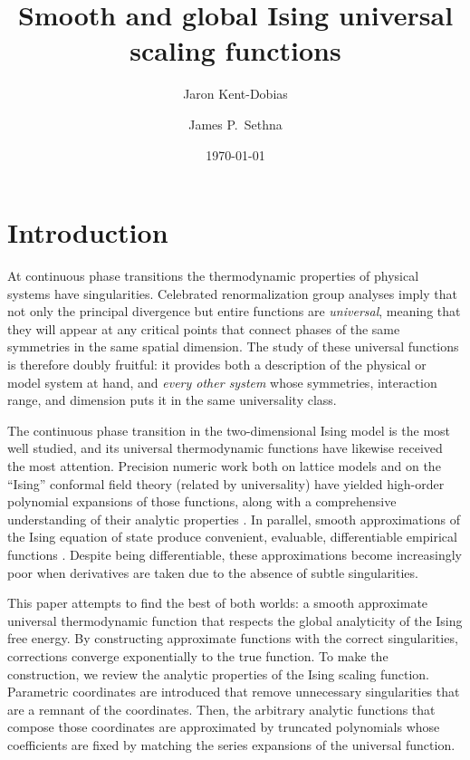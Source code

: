 \documentclass[
  aps,
  pre,
  preprint,
  longbibliography,
  floatfix
]{revtex4-2}
\begin{document}
\title{Smooth and global Ising universal scaling functions}

\author{Jaron Kent-Dobias}

\author{James P.~Sethna}

\date\today

\begin{abstract}
\end{abstract}

\maketitle

\section{Introduction}

At continuous phase transitions the thermodynamic properties of physical
systems have singularities. Celebrated renormalization group analyses imply
that not only the principal divergence but entire functions are
\emph{universal}, meaning that they will appear at any critical points that
connect phases of the same symmetries in the same spatial dimension. The study
of these universal functions is therefore doubly fruitful: it provides both a
description of the physical or model system at hand, and \emph{every other
system} whose symmetries, interaction range, and dimension puts it in the same
universality class.

The continuous phase transition in the two-dimensional Ising model is the most
well studied, and its universal thermodynamic functions have likewise received
the most attention. Precision numeric work both on lattice models and on the
``Ising'' conformal field theory (related by universality) have yielded
high-order polynomial expansions of those functions, along with a comprehensive
understanding of their analytic properties \cite{Fonseca_2003_Ising,
Mangazeev_2008_Variational, Mangazeev_2010_Scaling}.  In parallel, smooth
approximations of the Ising equation of state produce convenient, evaluable,
differentiable empirical functions \cite{Caselle_2001_The}. Despite being
differentiable, these approximations become increasingly poor when derivatives
are taken due to the absence of subtle singularities.

This paper attempts to find the best of both worlds: a smooth approximate
universal thermodynamic function that respects the global analyticity of the
Ising free energy. By constructing approximate functions with the correct
singularities, corrections converge exponentially to the true function. To make
the construction, we review the analytic properties of the Ising scaling
function. Parametric coordinates are introduced that remove unnecessary
singularities that are a remnant of the coordinates. Then, the arbitrary
analytic functions that compose those coordinates are approximated by truncated
polynomials whose coefficients are fixed by matching the series expansions of
the universal function.
\end{document}
